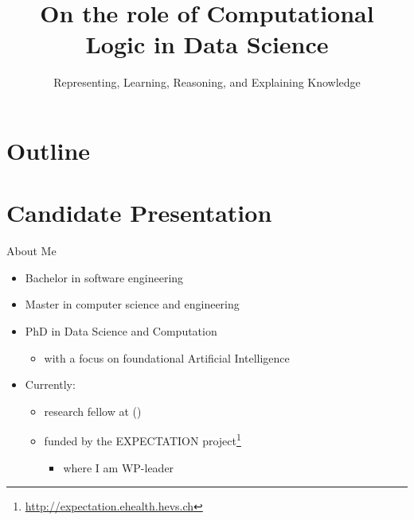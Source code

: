 \documentclass[presentation]{beamer}\mode<presentation>{\usetheme{AMSBolognaFC}}
\title[Role of CL in DS]{On the role of Computational Logic in Data Science}
\subtitle{Representing, Learning, Reasoning, and Explaining Knowledge}
\begin{document}

\frame{\titlepage}

\section*{Outline}
%
\frame[c]{\tableofcontents[hideallsubsections]}

\section{Candidate Presentation}

\begin{frame}{About Me}
    \begin{itemize}
        \item Bachelor in software engineering

        \vfill
        
        \item Master in computer science and engineering

        \vfill
        
        \item PhD in Data Science and Computation
        \begin{itemize}
            \item with a focus on foundational Artificial Intelligence
        \end{itemize}

        \vfill
        
        \item Currently:
        \begin{itemize}
            \item research fellow at \disiShort{} (\uniboShort{})
            \item funded by the EXPECTATION project\footnote{\url{http://expectation.ehealth.hevs.ch}}
            \begin{itemize}
                \item where I am WP-leader
            \end{itemize}
        \end{itemize}
    \end{itemize}
\end{frame}
\end{document}
